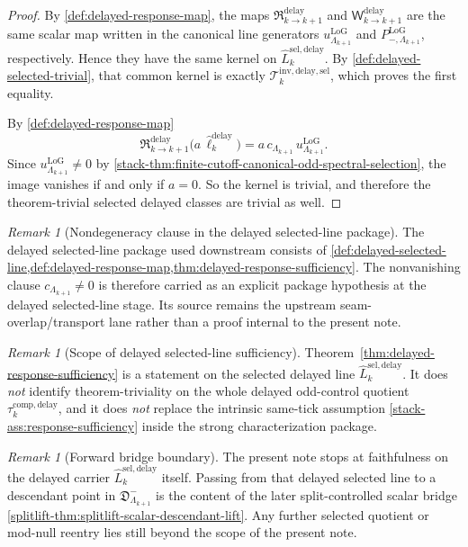 \documentclass[11pt]{article}
\theoremstyle{definition}
\theoremstyle{plain}
\theoremstyle{remark}
\newtheorem{remark}[definition]{Remark}
\begin{document}
\begin{proof}
By \cref{def:delayed-response-map}, the maps
\(
\mathfrak R^{\mathrm{delay}}_{k\to k+1}
\)
and
\(
\mathsf W^{\mathrm{delay}}_{k\to k+1}
\)
are the same scalar map written in the canonical line generators
\(
u^{\mathrm{LoG}}_{\Lambda_{k+1}}
\)
and
\(
P^{\mathrm{LoG}}_{-,\Lambda_{k+1}}
\),
respectively.
Hence they have the same kernel on
\(
\widehat L^{\mathrm{sel,delay}}_k
\).
By \cref{def:delayed-selected-trivial}, that common kernel is exactly
\(
\mathcal T^{\mathrm{inv,delay,sel}}_k
\),
which proves the first equality.

By \cref{def:delayed-response-map}
\[
\mathfrak R^{\mathrm{delay}}_{k\to k+1}\!\big(
a\,\widehat\ell^{\mathrm{delay}}_k
\big)
=
a\,c_{\Lambda_{k+1}}\,u^{\mathrm{LoG}}_{\Lambda_{k+1}}.
\]
Since
\(
u^{\mathrm{LoG}}_{\Lambda_{k+1}}\neq 0
\)
by \cref{stack-thm:finite-cutoff-canonical-odd-spectral-selection},
the image vanishes if and only if \(a=0\).
So the kernel is trivial, and therefore the theorem-trivial selected delayed classes are trivial as
well.
\end{proof}

\begin{remark}[Nondegeneracy clause in the delayed selected-line package]
The delayed selected-line package used downstream consists of
\cref{def:delayed-selected-line,def:delayed-response-map,thm:delayed-response-sufficiency}.
The nonvanishing clause \(c_{\Lambda_{k+1}}\neq 0\) is therefore carried as an explicit package
hypothesis at the delayed selected-line stage.
Its source remains the upstream seam-overlap/transport lane rather than a proof internal to the
present note.
\end{remark}

\begin{remark}[Scope of delayed selected-line sufficiency]
\label{rem:delay-vs-same-tick}
Theorem~\cref{thm:delayed-response-sufficiency} is a statement on the selected delayed line
\(\widehat L^{\mathrm{sel,delay}}_k\).
It does \emph{not} identify theorem-triviality on the whole delayed odd-control quotient
\(\tau^{\mathrm{comp,delay}}_k\), and it does \emph{not} replace the intrinsic same-tick
assumption \cref{stack-ass:response-sufficiency} inside the strong characterization package.
\end{remark}

\begin{remark}[Forward bridge boundary]
\label{rem:delay-forward-bridge}
The present note stops at faithfulness on the delayed carrier
\(
\widehat L^{\mathrm{sel,delay}}_k
\)
itself.
Passing from that delayed selected line to a descendant point in
\(
\mathfrak D^-_{\Lambda_{k+1}}
\)
is the content of the later split-controlled scalar bridge
\cref{splitlift-thm:splitlift-scalar-descendant-lift}.
Any further selected quotient or mod-null reentry lies still beyond the scope of the present note.
\end{remark}
\end{document}
